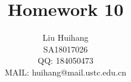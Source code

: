 
\title{
    Homework 10
}

\author{\name Liu Huihang  \\
        \addr SA18017026  \\
        QQ: 184050473 \\
        MAIL: huihang@mail.ustc.edu.cn
}


\maketitle